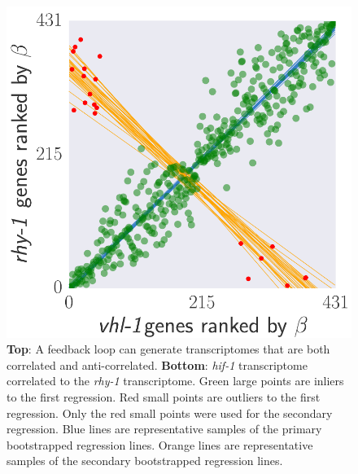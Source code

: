 \documentclass[9pt,twocolumn,twoside]{pnas-new}
\newcommand{\rhy}{\emph{rhy-1}}
\newcommand{\hif}{\emph{hif-1}}
\begin{document}
\begin{figure}[tbhp]
\centering
\includegraphics[width=\linewidth]{figs/correlative_genetics2.pdf}
\caption{
\textbf{Top}: A feedback loop can generate transcriptomes that are both
correlated and anti-correlated. \textbf{Bottom}: \hif{} transcriptome correlated
to the \rhy{} transcriptome. Green large points are inliers to the first
regression. Red small points are outliers to the first regression. Only the red
small points were used for the secondary regression. Blue lines are representative
samples of the primary bootstrapped regression lines. Orange lines are
representative samples of the secondary bootstrapped regression lines.
}
\label{fig:xpattern}
\end{figure}
\end{document}
